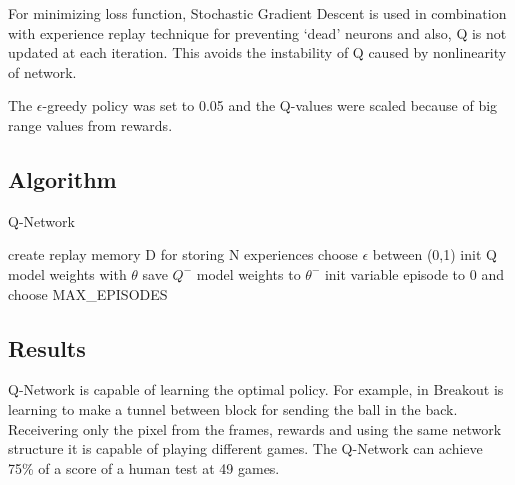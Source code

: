 For minimizing loss function, Stochastic Gradient Descent is used in combination with experience replay technique for preventing `dead' neurons and also, Q is not updated at each iteration. This avoids the instability of Q caused by nonlinearity of network.

The $\epsilon$-greedy policy was set to 0.05 and the Q-values were scaled because of big range values from rewards.
\newpage
\subsection{Algorithm\cite{nature}}
\begin{algorithm}
	\caption{Q-Network} \label{sgd-code}
	\begin{algorithmic}[1]
		\State create replay memory D for storing N experiences
		\State choose $\epsilon$ between (0,1)
		\State init Q model weights with $\theta$
		\State save $Q^-$ model weights to $\theta^-$
		\State init variable episode to 0 and choose MAX_EPISODES
		\EndWhile

		
	\end{algorithmic}
\end{algorithm}

\newpage


\subsection{Results\cite{nature}}


Q-Network is capable of learning the optimal policy. For example, in Breakout is learning to make a tunnel between block for sending the ball in the back. Receivering only the pixel from the frames, rewards and using the same network structure it is capable of playing different games. The Q-Network can achieve 75\% of a score of a human test at 49 games.


